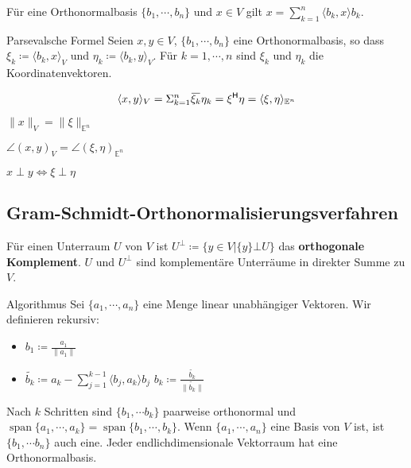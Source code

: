 \documentclass[a4paper,10pt]{article}
\DeclareMathOperator{\Span}{span}
\newcommand*{\hermconj}{\mathsf{H}}
\def\E{\mathbb{E}}
\newcommand{\overbar}[1]{\mkern 1.5mu\overline{\mkern-1.5mu#1\mkern-1.5mu}\mkern 1.5mu}
\begin{document}
Für eine Orthonormalbasis $\{b_1, \cdots, b_n\}$ und $x \in V$ gilt $x = \sum_{k=1}^n \langle b_k, x \rangle b_k$.

\begin{mainbox}{Parsevalsche Formel}
  Seien $x, y \in V$, $\{ b_1, \cdots, b_n \}$ eine Orthonormalbasis, so dass $\xi_k \coloneqq \langle b_k, x \rangle_V$ und $\eta_k \coloneqq \langle b_k, y \rangle_V$. Für $k = 1, \cdots, n$ sind $\xi_k$ und $\eta_k$ die Koordinatenvektoren. 

  $$\langle x, y \rangle_V = \Sigma_{k=1}^n \overbar{\xi_k} \eta_k = \xi^\hermconj \eta = \langle \xi, \eta \rangle_{\E^n}$$

  \begin{rowlist}
    \item $\lVert x \rVert_V = \lVert \xi \rVert_{\E^n}$
    \item $\angle (x,y)_V = \angle (\xi, \eta)_{\E^n}$
    \item $x \perp y \iff \xi \perp \eta$
  \end{rowlist}
\end{mainbox}

\subsection{Gram-Schmidt-Orthonormalisierungsverfahren}

\begin{subbox}{}
  Für einen Unterraum $U$ von $V$ ist $U^\bot \coloneqq \{ y \in V | \{y\} \bot U \}$ das \textbf{orthogonale Komplement}. $U$ und $U^\bot$ sind komplementäre Unterräume in direkter Summe zu $V$.
\end{subbox}

\begin{mainbox}{Algorithmus}
  Sei $\{a_1, \cdots, a_n\}$ eine Menge linear unabhängiger Vektoren. Wir definieren rekursiv:
  \begin{itemize}
    \item $b_1 \coloneqq \frac{a_1}{\lVert a_1 \rVert}$
    \item $\widetilde{b_k} \coloneqq a_k - \sum_{j=1}^{k-1} \langle b_j, a_k \rangle b_j$ \hfill $b_k \coloneqq \frac{\widetilde{b_k}}{\lVert \widetilde{b_k} \rVert}$
  \end{itemize}

  Nach $k$ Schritten sind $\{b_1, \cdots b_k\}$ paarweise orthonormal und $\Span \{a_1, \cdots, a_k\} = \Span \{b_1, \cdots, b_k\}$. Wenn $\{a_1, \cdots, a_n\}$ eine Basis von $V$ ist, ist $\{b_1, \cdots b_n\}$ auch eine. Jeder endlichdimensionale Vektorraum hat eine Orthonormalbasis.
\end{mainbox}
\end{document}
